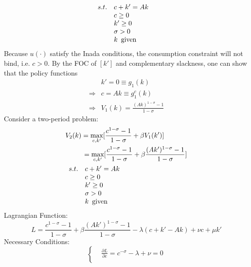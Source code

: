 \documentclass{article}
\begin{document}
\begin{enumerate}
\begin{enumerate}
\begin{align*}
                &\begin{array}{r@{\quad}l}
                    s.t.&c+k'=Ak\\
                    &c\ge0\\
                    &k'\ge0\\
                    &\sigma>0\\
                    &k\enspace\text{given}      
                \end{array}           
            \end{align*}
            Because $u(\cdot)$ satisfy the Inada conditions, the consumption constraint will not bind, i.e. $c>0$. By the FOC of $[k']$ and complementary slackness, one can show that the policy functions
            \begin{align*}
                &k'=0\equiv g_1(k)\\
                \Rightarrow&c=Ak\equiv g_1^c(k)\\
                \Rightarrow&V_1(k)=\frac{(Ak)^{1-\sigma}-1}{1-\sigma}
            \end{align*}
            Consider a two-period problem:
                \begin{align*}
                    &V_2(k)=\max_{c,k'}[\frac{c^{1-\sigma}-1}{1-\sigma}+\beta V_1(k')]\\
                    &\qquad\enspace=\max_{c,k'}[\frac{c^{1-\sigma}-1}{1-\sigma}+\beta\frac{(Ak')^{1-\sigma}-1}{1-\sigma}]\\
                    &\begin{array}{r@{\quad}l}
                        s.t.&c+k'=Ak\\
                        &c\ge0\\
                        &k'\ge0\\
                        &\sigma>0\\
                        &k\enspace\text{given}
                    \end{array}
                \end{align*}
            Lagrangian Function:
            \begin{equation*}
                L=\frac{c^{1-\sigma}-1}{1-\sigma}+\beta\frac{(Ak')^{1-\sigma}-1}{1-\sigma}-\lambda(c+k'-Ak)+\nu c+\mu k'
            \end{equation*}
            Necessary Conditions:
            \begin{equation*}
                \left\{\begin{aligned}
                    &\frac{\partial L}{\partial c}=c^{-\sigma}-\lambda+\nu=0\\

\end{aligned}
\end{equation*}
\end{enumerate}
\end{enumerate}
\end{document}
